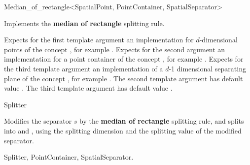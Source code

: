 
\begin{ccRefFunctionObjectClass}{Median_of_rectangle<SpatialPoint, PointContainer, SpatialSeparator>}  %

\ccDefinition
Implements the {\bf median of rectangle} splitting rule.

\ccParameters

Expects for the first template argument an implementation for
$d$-dimensional points of
the concept , 
for example . Expects for the second argument an implementation
for a point container of the concept , for example .
Expects for the third template argument an implementation of a $d$-1 dimensional 
separating plane of the concept , for example .
The second template argument has default value .
The third template argument has default value . 


\ccIsModel

Splitter

\ccTypes



\ccOperations

{Modifies the separator $s$ by the {\bf median of rectangle} splitting rule, 
and splits  into  and ,
using the splitting dimension and the splitting value of the modified separator.
}

\ccSeeAlso

Splitter, PointContainer, SpatialSeparator.
\end{ccRefFunctionObjectClass}




